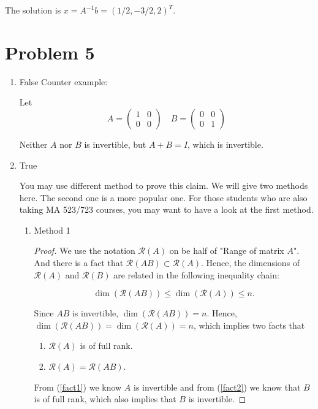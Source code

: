 \documentclass[12pt]{article}
\begin{document}
The solution is $x = A^{-1}b = (1/2, -3/2, 2)^T$.


\section{Problem 5}
\begin{enumerate}
\item False
Counter example:

Let 
$$
A = \begin{pmatrix}
1 & 0 \\
0 & 0
\end{pmatrix} \quad
B = \begin{pmatrix}
0 & 0 \\
0 & 1
\end{pmatrix} 
$$

Neither $A$ nor $B$ is invertible, but $A + B = I$, which is invertible.

\item True

You may use different method to prove this claim. We will give two methods here. The second one is a more popular one. For those students who are also taking MA 523/723 courses, you may want to have a look at the first method.

\begin{enumerate}
\item Method 1

\begin{proof}
We use the notation $\mathcal R (A)$ on be half of "Range of matrix $A$". And there is a fact that $\mathcal R (AB) \subset \mathcal R (A)$. Hence, the dimensions of $\mathcal R (A)$ and $\mathcal R(B)$ are related in the following inequality chain:

$$
\dim(\mathcal R(AB)) \leq \dim(\mathcal R(A)) \leq n.
$$

Since $AB$ is invertible, $\dim(\mathcal R(AB)) = n$. Hence, $\dim(\mathcal R(AB)) = \dim(\mathcal R(A)) = n$, which implies two facts that
\begin{enumerate}
\item\label{fact1} $\mathcal R(A)$ is of full rank.

\item\label{fact2} $\mathcal R(A) = \mathcal R(AB)$.
\end{enumerate}

From (\ref{fact1}) we know $A$ is invertible and from (\ref{fact2}) we know that $B$ is of full rank, which also implies that $B$ is invertible.
\end{proof}


\end{enumerate}
\end{enumerate}
\end{document}

